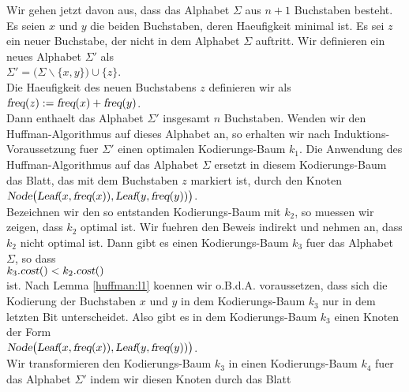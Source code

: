 \begin{enumerate}
  Wir gehen jetzt davon aus, dass das Alphabet $\Sigma$ aus $n+1$ Buchstaben besteht.
  Es seien $x$ und $y$ die beiden Buchstaben, deren Haeufigkeit minimal ist.
  Es sei $z$ ein neuer Buchstabe, der nicht in dem Alphabet $\Sigma$ auftritt.  Wir definieren
  ein neues Alphabet $\Sigma'$ als
  \\[0.2cm]
  \hspace*{1.3cm}
  $\Sigma' = \bigl(\Sigma \backslash \{x,y\}\bigr) \cup \{z\}$.
  \\[0.2cm]
  Die Haeufigkeit des neuen Buchstabens $z$ definieren wir als 
  \\[0.2cm]
  \hspace*{1.3cm}
  $\textsl{freq}(z) := \textsl{freq}(x) + \textsl{freq}(y)$.
  \\[0.2cm]
  Dann enthaelt das Alphabet $\Sigma'$ insgesamt $n$ Buchstaben.  Wenden wir den Huffman-Algorithmus
  auf dieses Alphabet an, so erhalten wir nach Induktions-Voraussetzung fuer $\Sigma'$ einen optimalen
  Kodierungs-Baum $k_1$.  Die Anwendung des Huffman-Algorithmus auf das Alphabet $\Sigma$ ersetzt in diesem
  Kodierungs-Baum das Blatt, das mit dem Buchstaben $z$ markiert ist, durch den Knoten 
  \\[0.2cm]
  \hspace*{1.3cm}
  $\textsl{Node}\bigl(\textsl{Leaf}(x, \textsl{freq}(x)), \textsl{Leaf}(y,\textsl{freq}(y))\bigr)$.
  \\[0.2cm]
  Bezeichnen wir den so entstanden Kodierungs-Baum mit $k_2$, so muessen wir zeigen, dass $k_2$ optimal
  ist.  Wir fuehren den Beweis indirekt und nehmen an, dass $k_2$ nicht optimal ist. Dann gibt es einen
  Kodierungs-Baum $k_3$ fuer das Alphabet $\Sigma$, so dass 
  \\[0.2cm]
  \hspace*{1.3cm}
  $k_3.\textsl{cost}() < k_2.\textsl{cost}()$
  \\[0.2cm]
  ist.  Nach Lemma \ref{huffman:l1} koennen wir o.B.d.A. voraussetzen, dass sich die Kodierung der 
  Buchstaben $x$ und $y$ in dem Kodierungs-Baum $k_3$ nur in dem letzten Bit
  unterscheidet.  Also gibt es in dem Kodierungs-Baum $k_3$ einen Knoten der Form
  \\[0.2cm]
  \hspace*{1.3cm}
  $\textsl{Node}\bigl(\textsl{Leaf}(x, \textsl{freq}(x)), \textsl{Leaf}(y,\textsl{freq}(y))\bigr)$.
  \\[0.2cm]
  Wir transformieren den Kodierungs-Baum $k_3$ in einen Kodierungs-Baum $k_4$ fuer das Alphabet $\Sigma'$ indem
  wir diesen Knoten durch das Blatt

\end{enumerate}
